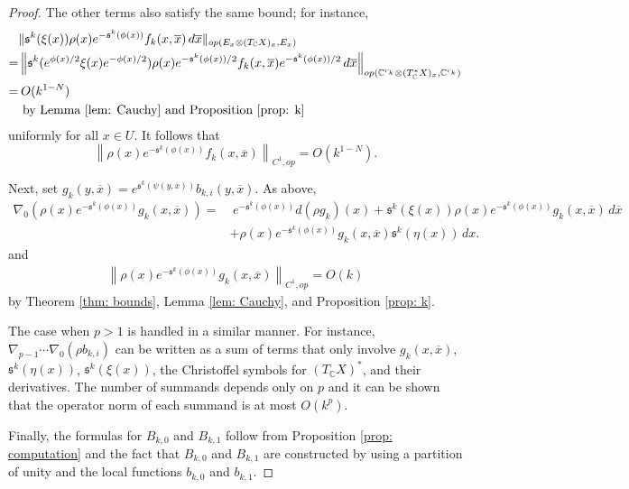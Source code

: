 \documentclass{amsart}
\theoremstyle{definition}
\theoremstyle{remark}
\numberwithin{equation}{section}
\begin{document}
\begin{proof}
The other terms also satisfy the same bound; for instance,
\begin{equation*}
\begin{split}
& \| \mathfrak{s}^k(\xi(x)) \rho(x) e^{-\mathfrak{s}^k(\phi(x))} f_k(x,\overline{x})  \,d\overline{x}  \|_{op (E_x \otimes (T_\mathbb{C}X)_x , E_x)} \\
    = & \left \| \mathfrak{s}^k(e^{\phi(x)/2} \xi(x) e^{-\phi(x)/2}) \rho(x) e^{-\mathfrak{s}^k(\phi(x))/2} f_k(x,\overline{x}) e^{-\mathfrak{s}^k(\phi(x))/2}  \,d\overline{x} \right \|_{op (\mathbb{C}^{r_k} \otimes (T_\mathbb{C}^*X)_x , \mathbb{C}^{r_k})} \\
    = & \hspace{2pt}  O(k^{1-N}) \\
    & \text{ by Lemma \ref{lem: Cauchy} and Proposition \ref{prop: k}}
\end{split}
\end{equation*}
uniformly for all $x \in U$. It follows that
\begin{equation*}
    \left \| \rho(x) e^{-\mathfrak{s}^k(\phi(x))} f_k(x,\overline{x} ) \right \|_{C^1,op} = O(k^{1-N}).
\end{equation*}


Next, set $g_k(y,\overline{x}) = e^{\mathfrak{s}^k(\psi(y,\overline{x}))} b_{k,i}(y,\overline{x})$. As above, 
\begin{align*}
\nabla_0 \left ( \rho(x) e^{-\mathfrak{s}^k(\phi(x))} g_k(x,\overline{x})  \right ) = & \hspace{3pt} e^{-\mathfrak{s}^k(\phi(x))} d (\rho g_k)(x) +  \mathfrak{s}^k(\xi(x)) \rho(x) e^{-\mathfrak{s}^k(\phi(x))} g_k(x,\overline{x})  \,d\overline{x} \\
    & + \rho(x)e^{-\mathfrak{s}^k(\phi(x))} g_k(x,\overline{x}) \mathfrak{s}^k(\eta(x)) \,dx.
\end{align*}
and
\begin{align*}
\left \|\rho(x) e^{-\mathfrak{s}^k(\phi(x))} g_k(x,\overline{x})  \right \|_{C^1,op} = O(k)
\end{align*}
by Theorem \ref{thm: bounds}, Lemma \ref{lem: Cauchy}, and Proposition \ref{prop: k}.

The case when $p > 1$ is handled in a similar manner. For instance, $\nabla_{p-1} \dotsb \nabla_{0} (\rho b_{k,i})$ can be written as a sum of terms that only involve $g_k(x,\overline{x})$, $\mathfrak{s}^k(\eta(x))$, $\mathfrak{s}^k(\xi(x))$, the Christoffel symbols for $(T_\mathbb{C} X)^*$, and their derivatives. The number of summands depends only on $p$ and it can be shown that the operator norm of each summand is at most $O(k^p)$.

Finally, the formulas for $B_{k,0}$ and $B_{k,1}$ follow from Proposition \ref{prop: computation} and the fact that $B_{k,0}$ and $B_{k,1}$ are constructed by using a partition of unity and the local functions $b_{k,0}$ and $b_{k,1}$.


\end{proof}
\end{document}
